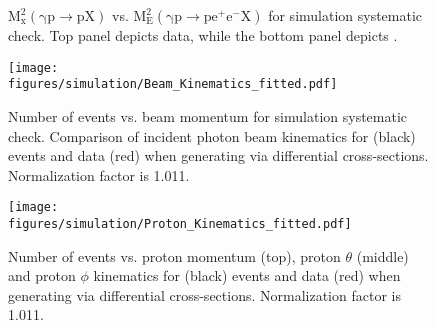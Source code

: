 	\begin{figure}[h!]\begin{center}
			
			\caption[$\mathrm{M_x^2(\gamma p \to p X)}$ vs. $\mathrm{M_E^2(\gamma p \to pe^+e^- X)}$ for simulation systematic check]{\label{fig:simsmear.mEMxP.data.MC}$\mathrm{M_x^2(\gamma p \to p X)}$ vs. $\mathrm{M_E^2(\gamma p \to pe^+e^- X)}$ for simulation systematic check. Top panel depicts data, while the bottom panel depicts .}
			
		\end{center}\end{figure}
		\begin{figure}[h!]\begin{center}
				\texttt{[image: \\figures/simulation/Beam\_Kinematics\_fitted.pdf]}
				\caption[Number of events vs. beam momentum for simulation systematic check]{\label{fig:simsmear.beam}Number of events vs. beam momentum for simulation systematic check. Comparison of incident photon beam kinematics for  (black) events and data (red) when generating  via differential cross-sections. Normalization factor is 1.011.}
			\end{center}\end{figure} 
			\begin{figure}[h!]\begin{center}
					\texttt{[image: \\figures/simulation/Proton\_Kinematics\_fitted.pdf]}
					\caption[Number of events vs. proton momentum (top), proton $\theta$ (middle) and proton $\phi$ kinematics for  (black) events and data (red) when generating  via differential cross-sections]{\label{fig:simsmear.prot}Number of events vs. proton momentum (top), proton $\theta$ (middle) and proton $\phi$ kinematics for  (black) events and data (red) when generating  via differential cross-sections. Normalization factor is 1.011. }
				\end{center}\end{figure} 
